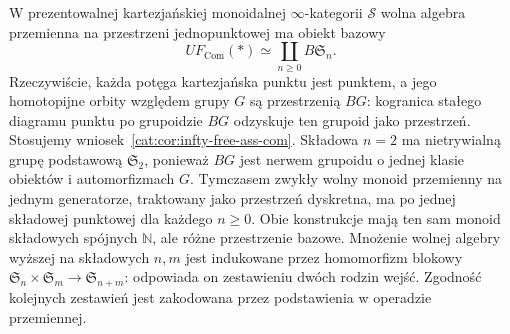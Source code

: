 \begin{przyklad}\label{cat:ex:infty-free-comm-point}
W prezentowalnej kartezjańskiej monoidalnej $\infty$-kategorii $\mathcal S$ wolna algebra przemienna na przestrzeni jednopunktowej ma obiekt bazowy
\[
 UF_{\mathrm{Com}}(*)\simeq\coprod_{n\geq0}B\mathfrak S_n.
\]
Rzeczywiście, każda potęga kartezjańska punktu jest punktem, a jego homotopijne orbity względem grupy $G$ są przestrzenią $BG$: kogranica stałego diagramu punktu po grupoidzie $BG$ odzyskuje ten grupoid jako przestrzeń. Stosujemy wniosek~\ref{cat:cor:infty-free-ass-com}. Składowa $n=2$ ma nietrywialną grupę podstawową $\mathfrak S_2$, ponieważ $BG$ jest nerwem grupoidu o jednej klasie obiektów i automorfizmach $G$. Tymczasem zwykły wolny monoid przemienny na jednym generatorze, traktowany jako przestrzeń dyskretna, ma po jednej składowej punktowej dla każdego $n\geq0$. Obie konstrukcje mają ten sam monoid składowych spójnych $\mathbb N$, ale różne przestrzenie bazowe. Mnożenie wolnej algebry wyższej na składowych $n,m$ jest indukowane przez homomorfizm blokowy $\mathfrak S_n\times\mathfrak S_m\to\mathfrak S_{n+m}$: odpowiada on zestawieniu dwóch rodzin wejść. Zgodność kolejnych zestawień jest zakodowana przez podstawienia w operadzie przemiennej.
\end{przyklad}

